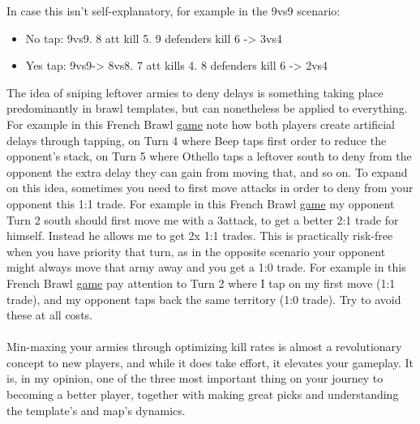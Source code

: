 In case this isn't self-explanatory, for example in the 9vs9 scenario:
\begin{itemize}
    \item No tap: 9vs9. 8 att kill 5. 9 defenders kill 6 -> 3vs4
    \item Yes tap: 9vs9-> 8vs8. 7 att kills 4. 8 defenders kill 6 -> 2vs4
\end{itemize}

The idea of sniping leftover armies to deny delays is something taking place predominantly in brawl templates, but can nonetheless be applied to everything. For example in this French Brawl  \href{https://www.warzone.com/MultiPlayer?GameID=21713173}{game} note how both players create artificial delays through tapping, on Turn 4 where Beep taps first order to reduce the opponent's stack, on Turn 5 where Othello taps a leftover south to deny from the opponent the extra delay they can gain from moving that, and so on. To expand on this idea, sometimes you need to first move attacks in order to deny from your opponent this 1:1 trade. For example in this French Brawl \href{https://www.warzone.com/MultiPlayer?GameID=41378170}{game} my opponent Turn 2 south should first move me with a 3attack, to get a better 2:1 trade for himself. Instead he allows me to get 2x 1:1 trades. This is practically risk-free when you have priority that turn, as in the opposite scenario your opponent might always move that army away and you get a 1:0 trade. For example in this French Brawl \href{https://www.warzone.com/MultiPlayer?GameID=40950869}{game} pay attention to Turn 2 where I tap on my first move (1:1 trade), and my opponent taps back the same territory (1:0 trade). Try to avoid these at all costs.
\\
\\

Min-maxing your armies through optimizing kill rates is almost a revolutionary concept to new players, and while it does take effort, it elevates your gameplay. It is, in my opinion, one of the three most important thing on your journey to becoming a better player, together with making great picks and understanding the template's and map's dynamics.